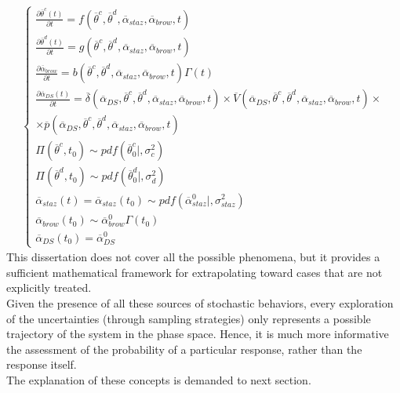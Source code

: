 \begin{equation}
\label{eq:fullSystemApprox1-3}
\begin{split}
\left\{\begin{matrix}
\frac{\partial  \overline{\theta}^{c}\left ( t \right )}{\partial t}=f\left ( \overline{\theta}^{c},\overline{\theta}^{d}, \overline{\alpha}_{staz} ,\overline{\alpha}_{brow},      t \right ) \\ 
\frac{\partial  \overline{\theta}^{d}\left ( t \right )}{\partial t}=g\left ( \overline{\theta}^{c},\overline{\theta}^{d},\overline{\alpha}_{staz},\overline{\alpha}_{brow},t \right )\\
\frac{\partial \overline{\alpha}_{brow} }{\partial t}=b\left ( \overline{\theta}^{c},\overline{\theta}^{d},\overline{\alpha}_{staz},\overline{\alpha}_{brow},t \right )\Gamma \left ( t \right ) \\
\frac{\partial  \overline{\alpha }_{DS}\left ( t \right )}{\partial t}=  \overline{\delta}\left ( \overline{\alpha }_{DS}, \overline{\theta}^{c},\overline{\theta}^{d},\overline{\alpha}_{staz},\overline{\alpha}_{brow},t \right ) \times \overline{V}\left ( \overline{\alpha }_{DS}, \overline{\theta}^{c},\overline{\theta}^{d},\overline{\alpha}_{staz},\overline{\alpha}_{brow},t \right ) \times 
\\ \times  \overline{p}\left ( \overline{\alpha }_{DS}, \overline{\theta}^{c},\overline{\theta}^{d},\overline{\alpha}_{staz},\overline{\alpha}_{brow},t \right )
\\
\Pi \left ( \overline{\theta}^{c},t_{0} \right ) \sim pdf\left ( \overline{\theta}^{c}_{0}|,\sigma_{c}^{2} \right )\\ 
\Pi \left ( \overline{\theta}^{d},t_{0} \right ) \sim pdf\left ( \overline{\theta}^{d}_{0}|,\sigma_{d}^{2} \right ) \\
\overline{\alpha}_{staz}\left ( t \right )=\overline{\alpha}_{staz}\left ( t_{0} \right ) \sim pdf\left ( \overline{\alpha}_{staz}^{0}|, \sigma_{staz}^{2} \right ) \\
\overline{\alpha}_{brow}\left ( t_{0} \right ) \sim  \overline{\alpha}_{brow}^{0} \Gamma \left ( t_{0} \right ) \\
\overline{\alpha}_{DS} \left ( t_{0} \right ) = \overline{\alpha}_{DS} ^{0}
\end{matrix}\right.
\end{split}
\end{equation}
This dissertation does not cover all the possible phenomena, but it 
provides a sufficient mathematical framework for extrapolating toward cases that are not explicitly treated. 
\\ Given the presence of all these sources of stochastic behaviors, every 
exploration of the uncertainties (through sampling strategies) only 
represents a possible trajectory of the system in the phase space. Hence, 
it is much more informative the assessment of the probability of a 
particular response, rather than the response itself.
\\The explanation of these concepts is demanded to next section.
%
%
%
%
